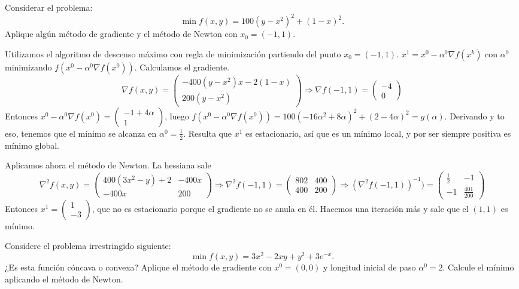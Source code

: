 \documentclass[twoside]{article}
\begin{document}
\begin{ejercicio}{4}
Considerar el problema:
$$\min f(x,y)=100(y-x^2)^2+(1-x)^2.$$
Aplique algún método de gradiente y el método de Newton con $x_0=(-1,1)$.
\end{ejercicio}
\begin{solucion}
Utilizamos el algoritmo de descenso máximo con regla de minimización partiendo del punto $x_0=(-1,1)$. $x^1=x^0-\alpha^0\nabla f(x^k)$ con $\alpha^0$ minimizando $f(x^0-\alpha^0\nabla f(x^0))$. Calculamos el gradiente. 
\[
\nabla f(x,y)=\begin{pmatrix}
-400(y-x^2)x-2(1-x)\\
200(y-x^2)
\end{pmatrix}\Rightarrow\nabla f(-1,1)=\begin{pmatrix}
-4\\
0
\end{pmatrix}
\]
Entonces $x^0-\alpha^0\nabla f(x^0)=\begin{pmatrix}
-1+4\alpha\\
1
\end{pmatrix}$, luego $f(x^0-\alpha^0\nabla f(x^0))=100(-16\alpha^2+8\alpha)^2+(2-4\alpha)^2=g(\alpha)$. Derivando y to eso, tenemos que el mínimo se alcanza en $\alpha^0=\frac{1}{2}$. Resulta que $x^1$ es estacionario, así que es un mínimo local, y por ser siempre positiva es mínimo global.

Aplicamos ahora el método de Newton. La hessiana sale
\[
\nabla^2 f(x,y)=\begin{pmatrix}
400(3x^2-y)+2 & -400x\\
-400x & 200
\end{pmatrix}\Rightarrow\nabla^2f(-1,1)=\begin{pmatrix}
802 & 400\\
400 & 200
\end{pmatrix}\Rightarrow(\nabla^2f(-1,1))^{-1})=\begin{pmatrix}
\frac{1}{2} & -1\\
-1 &\frac{401}{200}
\end{pmatrix}
\]
Entonces $x^1=\begin{pmatrix}
1\\
-3
\end{pmatrix}$, que no es estacionario porque el gradiente no se anula en él. Hacemos una iteración más y sale que el $(1,1)$ es mínimo.
\end{solucion}

\newpage
\begin{ejercicio}{5}
Considere el problema irrestringido siguiente:
$$\min f(x,y)=3x^2-2xy+y^2+3e^{-x}.$$
¿Es esta función cóncava o convexa? Aplique el método de gradiente con $x^0=(0,0)$ y longitud inicial de paso $\alpha^0=2$. Calcule el mínimo aplicando el método de Newton. 
\end{ejercicio}
\begin{solucion}
\end{solucion}
\end{document}
